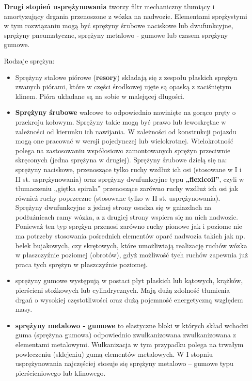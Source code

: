 \textbf{Drugi stopień usprężynowania} tworzy filtr mechaniczny tłumiący i amortyzujący drgania przenoszone z wózka na nadwozie. Elementami sprężystymi w tym rozwiązaniu mogą być sprężyny śrubowe naciskowe lub dwufunkcyjne, sprężyny pneumatyczne, sprężyny metalowo - gumowe lub czasem sprężyny gumowe. 

Rodzaje sprężyn:
\begin{itemize}
	\item Sprężyny stalowe piórowe (\textbf{resory}) składają się z zespołu płaskich sprężyn zwanych piórami, które w części środkowej ujęte są opaską z zaciśniętym klinem. Pióra układane są na sobie w malejącej długości.
	\item \textbf{Sprężyny śrubowe} walcowe to odpowiednio nawinięte na gorąco pręty o przekroju kołowym. Sprężyny takie mogą być prawo lub lewoskrętne w zależności od kierunku ich nawijania. 
	W zależności od konstrukcji pojazdu mogą one pracować w wersji pojedynczej lub wielokrotnej. Wielokrotność polega na zastosowaniu współosiowo zamontowanych sprężyn przeciwnie skręconych (jedna sprężyna w drugiej). 
	Sprężyny śrubowe dzielą się na: sprężyny naciskowe, przenoszące tylko ruchy wzdłuż ich osi (stosowane w I i II st. usprężynowania) oraz sprężyny dwufunkcyjne typu \textbf{„flexicoil”}, czyli w tłumaczeniu „giętka spirala” przenoszące zarówno ruchy wzdłuż ich osi jak również ruchy poprzeczne (stosowane tylko w II st. usprężynowania). 
	Sprężyny dwufunkcyjne z jednej strony osadza się w gniazdach na podłużnicach ramy wózka, a z drugiej strony wspiera się na nich nadwozie. Ponieważ ten typ sprężyn przenosi zarówno ruchy pionowe jak i poziome nie ma potrzeby stosowania pośrednich elementów oparć nadwozia takich jak np. belek bujakowych, czy skrętowych, które umożliwiają realizację ruchów wózka w płaszczyźnie poziomej (obrotów), gdyż możliwość tych ruchów zapewnia już praca tych sprężyn w płaszczyźnie poziomej.
	\item sprężyny gumowe występują w postaci płyt płaskich lub kątowych, krążków, pierścieni stożkowych lub cylindrycznych. Mają dużą zdolność tłumienia drgań o wysokiej częstotliwości oraz dużą pojemność energetyczną względem masy.
	\item \textbf{sprężyny metalowo - gumowe} to elastyczne bloki w których skład wchodzi guma (sprężyna gumowa) odpowiednio zwulkanizowana zwulkanizowana z elementami metalowymi. Wulkanizacja w tym przypadku polega na trwałym powleczeniu (sklejeniu) gumą elementów metalowych. 
	W I stopniu usprężynowania najczęściej stosuje się sprężyny metalowo – gumowe typu pierścieniowego lub klinowego. 

\end{itemize}
